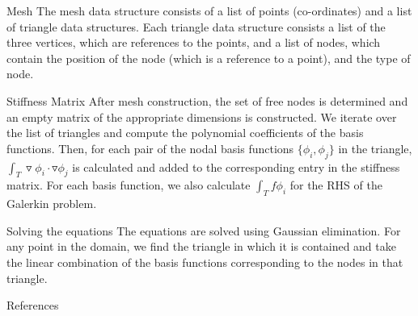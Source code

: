 \documentclass{beamer}
\begin{document}
\begin{frame}{Mesh}
The mesh data structure consists of a list of points (co-ordinates) and a list of triangle data structures.
\linebreak\linebreak
Each triangle data structure consists a list of the three vertices, which are references to the points, and a list of nodes, which contain the position of the node (which is a reference to a point), and the type of node.
\end{frame}
\begin{frame}{Stiffness Matrix}
After mesh construction, the set of free nodes is determined and an empty matrix of the appropriate dimensions is constructed.
\linebreak\linebreak
We iterate over the list of triangles and compute the polynomial coefficients of the basis functions.
\linebreak\linebreak
Then, for each pair of the nodal basis functions $\{\phi_i,\phi_j\}$ in the triangle, $\int_{T} \triangledown\phi_i \cdot \triangledown \phi_j$ is calculated and added to the corresponding entry in the stiffness matrix.
\linebreak\linebreak
For each basis function, we also calculate $\int_{T}f\phi_i$ for the RHS of the Galerkin problem.
\end{frame}
\begin{frame}{Solving the equations}
The equations are solved using Gaussian elimination.
\linebreak\linebreak
For any point in the domain, we find the triangle in which it is contained and take the linear combination of the basis functions corresponding to the nodes in that triangle.
\end{frame}
\begin{frame}{References}
\printbibliography
\end{frame}
\end{document}
